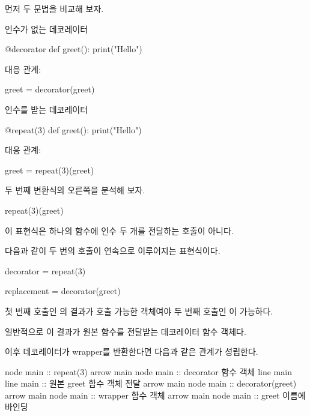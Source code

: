 먼저 두 문법을 비교해 보자.

\begin{dhknote}
\begin{dhksmry}[centered]
인수가 없는 데코레이터
\end{dhksmry}
\end{dhknote}

\begin{dhkcode}
@decorator
def greet():
    print("Hello")
\end{dhkcode}

대응 관계:

\begin{dhkcode}
greet = decorator(greet)
\end{dhkcode}

\begin{dhknote}
\begin{dhksmry}[centered]
인수를 받는 데코레이터
\end{dhksmry}
\end{dhknote}

\begin{dhkcode}
@repeat(3)
def greet():
    print("Hello")
\end{dhkcode}

대응 관계:

\begin{dhkcode}
greet = repeat(3)(greet)
\end{dhkcode}

두 번째 변환식의 오른쪽을 분석해 보자.

\begin{dhkcode}
repeat(3)(greet)
\end{dhkcode}

이 표현식은 하나의 함수에 인수 두 개를 전달하는 호출이 아니다.

다음과 같이 두 번의 호출이 연속으로 이루어지는 표현식이다.

\begin{dhkcode}
decorator = repeat(3)

replacement = decorator(greet)
\end{dhkcode}

첫 번째 호출인 의 결과가 호출 가능한 객체여야 두 번째 호출인
이 가능하다.

일반적으로 이 결과가 원본 함수를 전달받는 데코레이터 함수 객체다.

이후 데코레이터가 wrapper를 반환한다면 다음과 같은 관계가 성립한다.

\begin{dhkbranch}[in=8]
node main :: repeat(3)
arrow main
node main :: decorator 함수 객체
line main
line main :: 원본 greet 함수 객체 전달
arrow main
node main :: decorator(greet)
arrow main
node main :: wrapper 함수 객체
arrow main
node main :: greet 이름에 바인딩
\end{dhkbranch}

